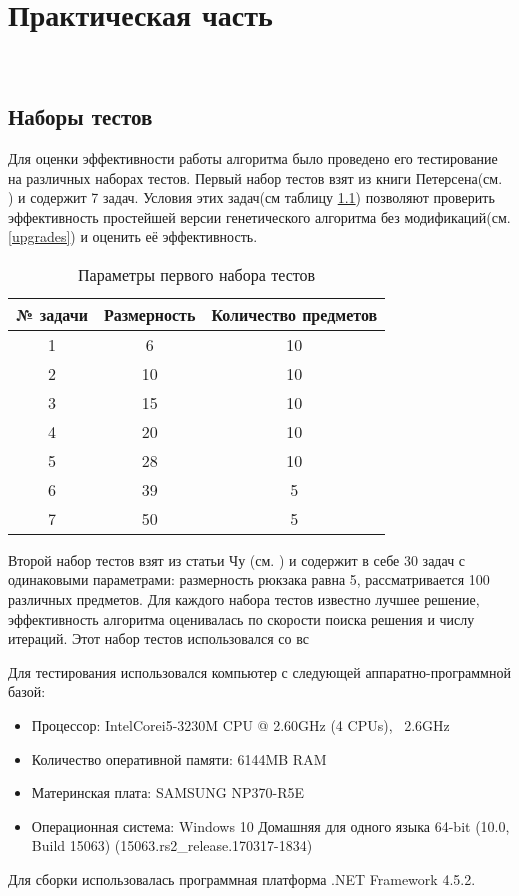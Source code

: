 \chapter{Практическая часть}
\
\section{Наборы тестов}

Для оценки эффективности работы алгоритма было проведено его тестирование на различных наборах тестов.
Первый набор тестов взят из книги Петерсена(см. \cite{Петерсен1967}) и содержит 7 задач. Условия этих задач(см таблицу \ref{table1}) позволяют проверить эффективность простейшей версии генетического алгоритма без модификаций(см. \ref{upgrades}) и оценить её эффективность. %

\begin{table}[ht]%
\centering
\begin{tabular}{|c|c|c|}
\hline
№ задачи & Размерность & Количество предметов \\ \hline
1        & 6           & 10                   \\ \hline
2        & 10          & 10                   \\ \hline
3        & 15          & 10                   \\ \hline
4        & 20          & 10                   \\ \hline
5        & 28          & 10                   \\ \hline
6        & 39          & 5                    \\ \hline
7        & 50          & 5                    \\ \hline
\end{tabular}
\caption{Параметры первого набора тестов}
\label{table1}
\end{table}  

Второй набор тестов взят из статьи Чу (см. \cite{Чу1998}) и содержит в себе 30 задач с одинаковыми параметрами: размерность рюкзака равна 5, рассматривается 100 различных предметов.
Для каждого набора тестов известно лучшее решение, эффективность алгоритма оценивалась по скорости поиска решения и числу итераций. Этот набор тестов использовался со вс

Для тестирования использовался компьютер с следующей аппаратно-программной базой:
\begin{itemize}
\item {Процессор: Intel\textregistered Core\texttrademark i5-3230M CPU @ 2.60GHz (4 CPUs), ~2.6GHz}
\item {Количество оперативной памяти: 6144MB RAM}
\item {Материнская плата: SAMSUNG NP370-R5E}
\item {Операционная система: Windows 10 Домашняя для одного языка 64-bit (10.0, Build 15063) (15063.rs2\_release.170317-1834)}
\end{itemize}
Для сборки использовалась программная платформа .NET Framework 4.5.2.

